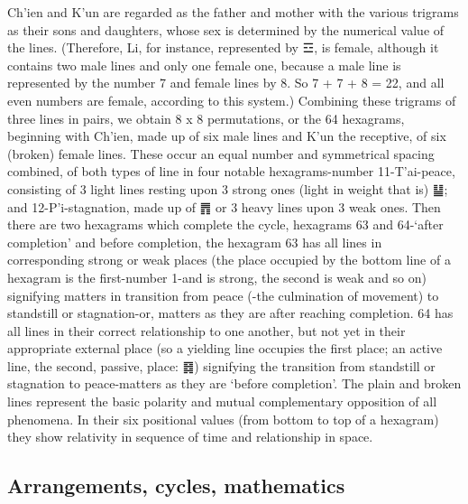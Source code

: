 \documentclass[11pt]{book}
\begin{document}
Ch'ien and K'un are regarded as the father and mother with the various trigrams as their sons and daughters, whose sex is determined by the numerical value of the lines. (Therefore, Li, for instance, represented by ☲, is female, although it contains two male lines and only one female one, because a male line is represented by the number 7 and female lines by 8. So 7 + 7 + 8 = 22, and all even numbers are female, according to this system.) Combining these trigrams of three lines in pairs, we obtain 8 x 8 permutations, or the 64 hexagrams, beginning with Ch'ien, made up of six male lines and K'un the receptive, of six (broken) female lines. These occur an equal number and symmetrical spacing combined, of both types of line in four notable hexagrams-number 11-T'ai-peace, consisting of 3 light lines resting upon 3 strong ones (light in weight that is) ䷊; and 12-P'i-stagnation, made up of ䷋ or 3 heavy lines upon 3 weak ones. Then there are two hexagrams which complete the cycle, hexagrams 63 and 64-`after completion' and before completion, the hexagram 63 has all lines in corresponding strong or weak places (the place occupied by the bottom line of a hexagram is the first-number 1-and is strong, the second is weak and so on) signifying matters in transition from peace (-the culmination of movement) to standstill or stagnation-or, matters as they are after reaching completion. 64 has all lines in their correct relationship to one another, but not yet in their appropriate external place (so a yielding line occupies the first place; an active line, the second, passive, place: ䷿) signifying the transition from standstill or stagnation to peace-matters as they are `before completion'. The plain and broken lines represent the basic polarity and mutual complementary opposition of all phenomena. In their six positional values (from bottom to top of a hexagram) they show relativity in sequence of time and relationship in space.

\hypertarget{arrangements-cycles-mathematics}{%
\subsection{Arrangements, cycles, mathematics}\label{arrangements-cycles-mathematics}}
\end{document}
